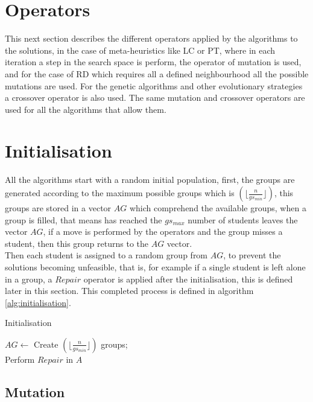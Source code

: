 \section{Operators}

This next section describes the different operators applied by the algorithms to the solutions, in the case of meta-heuristics like LC or PT, where in each iteration a step in the search space is perform, the operator of mutation is used, and for the case of RD which requires all a defined neighbourhood all the possible mutations are used. For the genetic algorithms and other evolutionary strategies a crossover operator is also used. The same mutation and crossover operators are used for all the algorithms that allow them.

\section{Initialisation}

All the algorithms start with a random initial population, first, the groups are generated according to the maximum possible groups which is $(\lfloor\frac{n}{gs_{min}}\rfloor)$, this groups are stored in a vector $AG$ which comprehend the available groups, when a group is filled, that means has reached the $gs_{max}$ number of students leaves the vector $AG$, if a move is performed by the operators and the group misses a student, then this group returns to the $AG$ vector.\\

Then each student is assigned to a random group from $AG$, to prevent the solutions becoming unfeasible, that is, for example if a single student is left alone in a group, a $Repair$ operator is applied after the initialisation, this is defined later in this section. This completed process is defined in algorithm \ref{alg:initialisation}.

\begin{algorithm}[H]
\caption{Initialisation}
\label{alg:initialisation}
\SetAlgoLined 
$AG \leftarrow$ Create $(\lfloor\frac{n}{gs_{min}}\rfloor)$ groups;\\
Perform $Repair$ in $A$
\end{algorithm}

\subsection{Mutation}

